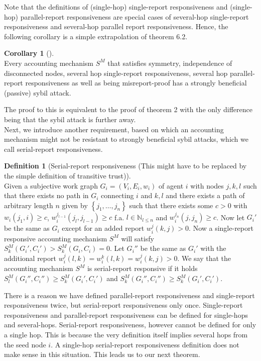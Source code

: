 \documentclass[11pt,a4paper]{report}
\theoremstyle{definition}
\newtheorem{definition}{Definition}[section]
\theoremstyle{theorem}
\theoremstyle{proposition}
\theoremstyle{corollary}
\newtheorem{corollary}{Corollary}[section]
\theoremstyle{lemma}
\theoremstyle{example}
\theoremstyle{remark}
\begin{document}
\noindent{}Note that the definitions of (single-hop) single-report responsiveness and (single-hop) parallel-report responsiveness are special cases of several-hop single-report responsiveness and several-hop parallel report responsiveness. Hence, the following corollary is a simple extrapolation of theorem 6.2.

\begin{corollary}[]\ \\
Every accounting mechanism $S^M$ that satisfies symmetry, independence of disconnected nodes, several hop single-report responsiveness, several hop parallel-report responsiveness as well as being misreport-proof has a strongly beneficial (passive) sybil attack. 
\end{corollary}
\noindent{}The proof to this is equivalent to the proof of theorem 2 with the only difference being that the sybil attack is further away. \vspace{1em}\\

\noindent{}Next, we introduce another requirement, based on which an accounting mechanism might not be resistant to strongly beneficial sybil attacks, which we call serial-report responsiveness.

\begin{definition}[Serial-report responsiveness (This might have to be replaced by the simple definition of transitive trust)]\ \\
Given a subjective work graph $G_i=(V_i,E_i,w_i)$ of agent $i$ with nodes $j,k,l$ such that there exists no path in $G_i$ connecting $i$ and $k,l$ and there exists a path of arbitrary length $n$ given by $\left\lbrace{}j_1,\ldots,j_n\right\rbrace$ such that there exists some $c>0$ with $w_i(j_1,i)\geq{}c$, $w_i^{j_{l-1}}(j_l,j_{l-1})\geq{}c$ f.a. $l\in\mathbb{N}_{l\leq{}n}$ and $w_i^{j_n}(j,j_n)\geq{}c$. Now let $G_i'$ be the same as $G_i$ except for an added report $w_i^j(k,j)>0$. Now a single-report responsive accounting mechanism $S^M$ will satisfy $S^M_k(G_i',C_i')>S^M_k(G_i,C_i)=0$. Let $G_i''$ be the same as $G_i'$ with the additional report $w_i^j(l,k)=w_i^k(l,k)=w_i^j(k,j)>0$. We say that the accounting mechanism $S^M$ is serial-report responsive if it holds $S^M_l(G_i'',C_i'')\geq{}S^M_k(G_i',C_i')$ and $S^M_k(G_i'',C_i'')\geq{}S^M_k(G_i',C_i')$.
\end{definition}

\noindent{}There is a reason we have defined parallel-report responsiveness and single-report responsiveness twice, but serial-report responsiveness only once. Single-report responsiveness and parallel-report responsiveness can be defined for single-hops and several-hops. Serial-report responsiveness, however cannot be defined for only a single hop. This is because the very definition itself implies several hops from the seed node $i$. A single-hop serial-report responsiveness definition does not make sense in this situation. This leads us to our next theorem.\vspace{1em}\\
\end{document}
